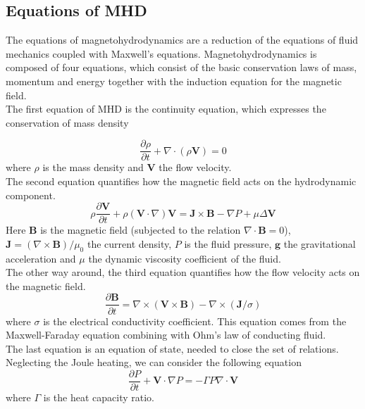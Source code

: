 \documentclass[12pt,openany]{amsbook}
\newcommand{\bbm}[1]{{\mathbf{#1}}}
\begin{document}
\subsection{Equations of MHD}

The equations of magnetohydrodynamics are a reduction of the equations of fluid mechanics coupled with Maxwell’s equations.
Magnetohydrodynamics is composed of four equations, which consist of the basic conservation laws of mass, momentum and energy together 
with the induction equation for the magnetic field. \cite{baty:hal-03711796}\\

The first equation of MHD is the continuity
equation, which expresses the conservation of mass density 

\begin{equation}
    \frac{\partial \rho}{\partial t} + \nabla \cdot ( \rho \bbm V ) = 0
    \tag{a}
\end{equation}
where $\rho$ is the mass density and $\bbm V$ the flow velocity.\\

The second equation quantifies how the magnetic field acts on the hydrodynamic component.
\begin{equation}
    \rho \frac{\partial \bbm V}{\partial t} + \rho ( \bbm V \cdot \nabla)\bbm V =  \bbm J \times \bbm B - \nabla P + \mu \Delta \bbm V 
    \tag{b}
\end{equation}
Here $\bbm B$ is the magnetic field (subjected to the relation $\nabla \cdot \bbm B = 0$), 
$\bbm J = (\nabla \times \bbm B) / \mu_0$ the current density, $P$ is the fluid pressure,  $\bbm g$ the gravitational acceleration
and $\mu$ the dynamic viscosity coefficient of the fluid.\\

The other way around, the third equation quantifies how the flow velocity acts on the magnetic field.
\begin{equation}
    \frac{\partial \bbm B}{\partial t} = \nabla \times( \bbm V \times \bbm B) - \nabla \times (\bbm J/\sigma)
    \tag{c}
\end{equation}
where $\sigma$ is the electrical conductivity coefficient. This equation comes from the Maxwell-Faraday equation combining
with Ohm's law of conducting fluid.\\

The last equation is an equation of state, needed to close the set of relations. Neglecting the 
Joule heating, we can consider the following equation
\begin{equation}
    \frac{\partial P}{\partial t} + \bbm V \cdot \nabla P = - \Gamma P \nabla \cdot \bbm V
    \tag{c}
\end{equation}
where $\Gamma$ is the heat capacity ratio.\\
\end{document}

